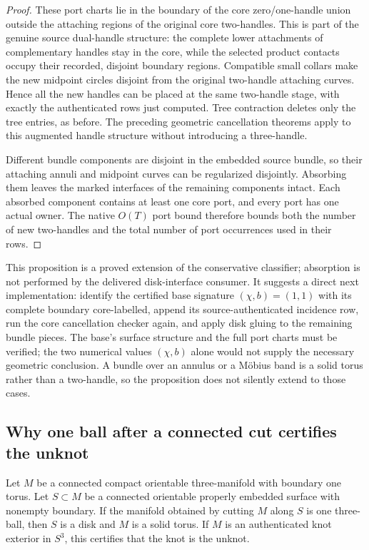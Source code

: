 \begin{proof}
These port charts lie in the boundary of the core zero/one-handle union
outside the attaching regions of the original core two-handles.  This is
part of the genuine source dual-handle structure: the complete lower
attachments of complementary handles stay in the core, while the selected
product contacts occupy their recorded, disjoint boundary regions.
Compatible small collars make the new midpoint circles disjoint from the
original two-handle attaching curves.  Hence all the new handles can be
placed at the same two-handle stage, with exactly the authenticated rows
just computed.  Tree contraction deletes only the tree entries, as before.
The preceding geometric cancellation theorems apply to this augmented
handle structure without introducing a three-handle.

Different bundle components are disjoint in the embedded source bundle,
so their attaching annuli and midpoint curves can be regularized
disjointly.  Absorbing them leaves the marked interfaces of the remaining
components intact.  Each absorbed component contains at least one core
port, and every port has one actual owner.  The native $O(T)$ port bound
therefore bounds both the number of new two-handles and the total number
of port occurrences used in their rows.
\end{proof}

This proposition is a proved extension of the conservative classifier;
absorption is not performed by the delivered disk-interface consumer.
It suggests a direct next implementation: identify the certified base
signature $(\chi,b)=(1,1)$ with its complete boundary core-labelled,
append its source-authenticated incidence row, run the core cancellation
checker again, and apply disk gluing to the remaining bundle pieces.
The base's surface structure and the full port charts must be verified;
the two numerical values $(\chi,b)$ alone would not supply the necessary
geometric conclusion.  A bundle over an annulus or a M\"obius band is a
solid torus rather than a two-handle, so the proposition does not silently
extend to those cases.

\subsection{Why one ball after a connected cut certifies the unknot}
\label{geo:terminal}

\begin{proposition}
\label{geo:prop-terminal}
Let $M$ be a connected compact orientable three-manifold with boundary one
torus.  Let $S\subset M$ be a connected orientable properly embedded
surface with nonempty boundary.  If the manifold obtained by cutting $M$
along $S$ is one three-ball, then $S$ is a disk and $M$ is a solid torus.
If $M$ is an authenticated knot exterior in $S^3$, this certifies that the
knot is the unknot.
\end{proposition}

